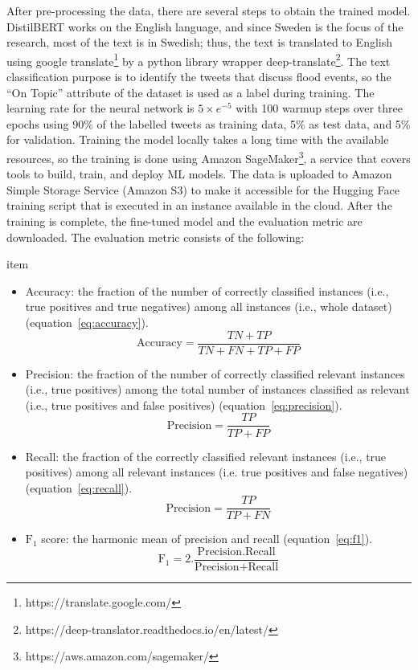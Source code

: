After pre-processing the data, there are several steps to obtain the trained model. DistilBERT works
on the English language, and since Sweden is the focus of the research, most of the text is in
Swedish; thus, the text is translated to English using google
translate\footnote{https://translate.google.com/} by a python library wrapper
deep-translate\footnote{https://deep-translator.readthedocs.io/en/latest/}. The text classification
purpose is to identify the tweets that discuss flood events, so the ``On Topic'' attribute of the
dataset is used as a label during training. The learning rate for the neural network is $5\times e^{-5}$ with
100 warmup steps over three epochs using 90\% of the labelled tweets as training data, 5\% as test
data, and 5\% for validation. Training the model locally takes a long time with the available
resources, so the training is done using Amazon
SageMaker\footnote{https://aws.amazon.com/sagemaker/}, a service that covers tools to build, train,
and deploy \ac{ML} models. The data is uploaded to Amazon Simple Storage Service (Amazon S3) to make it
accessible for the Hugging Face training script that is executed in an instance available in the
cloud. After the training is complete, the fine-tuned model and the evaluation metric are
downloaded. The evaluation metric consists of the following:

item
\begin{itemize}
  \item Accuracy: the fraction of the number of correctly classified instances (i.e., true positives
    and true negatives) among all instances (i.e., whole dataset) (equation~\ref{eq:accuracy}).
 \begin{equation}
   \text{Accuracy}=\frac{TN+TP}{TN+FN+TP+FP} 
   \label{eq:accuracy}
\end{equation}
\item Precision: the fraction of the number of correctly classified relevant instances (i.e., true
  positives) among the total number of instances classified as relevant (i.e., true positives and
  false positives) (equation~\ref{eq:precision}).
 \begin{equation}
   \text{Precision}=\frac{TP}{TP+FP} 
   \label{eq:precision}
\end{equation}
\item Recall: the fraction of the correctly classified relevant instances (i.e., true positives)
  among all relevant instances (i.e. true positives and false negatives) (equation~\ref{eq:recall}).
 \begin{equation}
   \text{Precision}=\frac{TP}{TP+FN} 
   \label{eq:recall}
\end{equation}
\item $\text{F}_1$ score: the harmonic mean of precision and recall (equation~\ref{eq:f1}).
 \begin{equation}
   \text{F}_1 =2.\frac{\text{Precision}.\text{Recall}}{\text{Precision}+\text{Recall}} 
   \label{eq:f1}
\end{equation}
\end{itemize}
  

  
